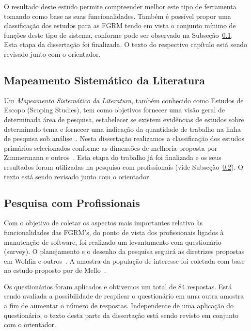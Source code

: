 \documentclass[10pt,a4paper]{report}
\begin{document}
	O resultado deste estudo permite compreender melhor este tipo de ferramenta
	tomando como base as suas funcionalidades. Também é possível propor uma
	classificação dos estudos para as FGRM tendo em vista o conjunto mínimo de
	funções deste tipo de sistema, conforme pode ser observado na
	Subseção~\ref{subsec:revisao_sistematica}. Esta etapa da dissertação foi
	finalizada. O texto do respectivo capítulo está sendo revisado junto com o
	orientador.

	\subsection{Mapeamento Sistemático da Literatura}
	\label{subsec:revisao_sistematica}

	Um \textit{Mapeamento Sistemático da Literatura}, também conhecido como Estudos
	de Escopo (Scoping Studies), tem como objetivos fornecer uma visão geral de
	determinada área de pesquisa, estabelecer se existem evidências de estudos sobre
	determinado tema e fornecer uma indicação da quantidade de trabalho na linha de
	pesquisa sob análise~\cite{keele2007guidelines,wohlin2012experimentation}. Nesta
	dissertação realizamos a classificação dos estudos primários selecionados
	conforme as dimensões de melhoria proposta por Zimmermann e
	outros~\cite{zimmermann2009improving}. Esta etapa do trabalho já foi finalizada
	e os seus resultados foram utilizadas na pesquisa com profissionais (vide
	Subseção~\ref{subsec:survey}). O texto está sendo revisado junto com o
	orientador.

	\subsection{Pesquisa com Profissionais}
	\label{subsec:survey}

	Com o objetivo de coletar os aspectos mais importantes relativo às
	fun\-ci\-o\-na\-li\-da\-des das FGRM's, do ponto de vista dos profissionais
	ligados à manutenção de software, foi realizado um levantamento com questionário
	(survey).  O planejamento e o desenho da pesquisa seguirá as diretrizes
	propostas em Wohlin e outros~\cite{wohlin2012experimentation}. A amostra da
	população de interesse foi coletada com base no estudo proposto por de
	Mello~\cite{de2015investigating}.

	Os questionários foram aplicados e obtivemos um total de 84 respostas. Está
	sendo avaliada a possibilidade de reaplicar o questionário em uma outra amostra
	a fim de aumentar o número de respostas. Independente de uma aplicação do
	questionário, o texto desta parte da dissertação está sendo revisto em conjunto
	com o orientador.
\end{document}
